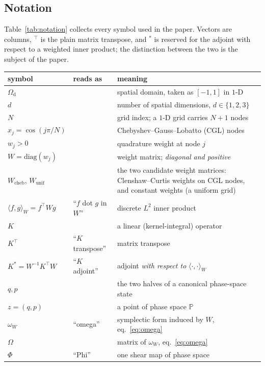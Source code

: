 \documentclass[11pt]{article}
\theoremstyle{definition}
\theoremstyle{remark}
\newcommand{\iprod}[2]{\langle #1, #2 \rangle}
\newcommand{\Wc}{W_{\mathrm{cheb}}}
\newcommand{\Wu}{W_{\mathrm{unif}}}
\begin{document}
\subsection{Notation}
\label{sec:notation}

Table~\ref{tab:notation} collects every symbol used in the paper. Vectors are
columns, $^{\top}$ is the plain matrix transpose, and $^{*}$ is reserved for the
adjoint with respect to a weighted inner product; the distinction between the two is the subject of the paper.

\begin{center}
\label{tab:notation}
\small
\begin{tabular}{@{}llp{78mm}@{}}
\toprule
symbol & reads as & meaning \\
\midrule
$\Omega_{\mathrm{d}}$ & & spatial domain, taken as $[-1,1]$ in $1$-D \\
$d$ & & number of spatial dimensions, $d\in\{1,2,3\}$ \\
$N$ & & grid index; a $1$-D grid carries $N{+}1$ nodes \\
$x_j=\cos(j\pi/N)$ & & Chebyshev--Gauss--Lobatto (CGL) nodes \\
$w_j>0$ & & quadrature weight at node $j$ \\
$W=\mathrm{diag}(w_j)$ & & weight matrix; \emph{diagonal and positive} \\
$\Wc$, $\Wu$ & & the two candidate weight matrices: Clenshaw--Curtis weights on CGL nodes, and constant weights (a uniform grid) \\
$\iprod{f}{g}_W=f^{\top}Wg$ & ``$f$ dot $g$ in $W$'' & discrete $L^2$ inner product \\
$K$ & & a linear (kernel-integral) operator \\
$K^{\top}$ & ``$K$ transpose'' & matrix transpose \\
$K^{*}=W^{-1}K^{\top}W$ & ``$K$ adjoint'' & adjoint \emph{with respect to} $\iprod{\cdot}{\cdot}_W$ \\
$q,p$ & & the two halves of a canonical phase-space state \\
$z=(q,p)$ & & a point of phase space $\mathbb{P}$ \\
$\omega_W$ & ``omega'' & symplectic form induced by $W$, eq.~\eqref{eq:omega} \\
$\Omega$ & & matrix of $\omega_W$, eq.~\eqref{eq:omega} \\
$\Phi$ & ``Phi'' & one shear map of phase space \\

\end{tabular}
\end{center}
\end{document}
